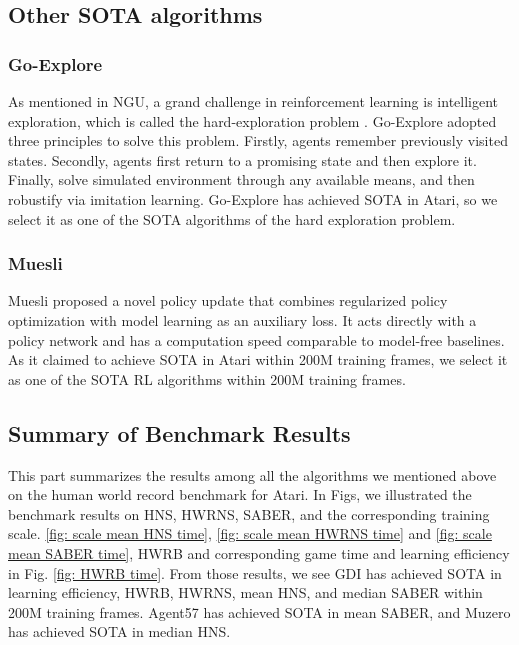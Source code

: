 \documentclass[nohyperref]{article}
\theoremstyle{plain}
\begin{document}
\subsection{Other SOTA algorithms}
\subsubsection{Go-Explore}
As mentioned in NGU, a grand challenge in reinforcement learning is intelligent exploration, which is called the hard-exploration problem \citep{ale2}. Go-Explore \citep{goexplore} adopted three principles to solve this problem. Firstly, agents remember previously visited states. Secondly, agents first return to a promising state and then explore it. Finally, solve simulated environment through any available means, and then robustify via imitation learning. Go-Explore has achieved SOTA in Atari, so we select it as one of the SOTA algorithms of the hard exploration problem.

\subsubsection{Muesli}
Muesli \citep{muesli} proposed a novel policy update that combines regularized policy optimization with model learning as an auxiliary loss. It acts directly with a policy network and has a computation speed comparable to model-free baselines. As it claimed to achieve SOTA in Atari within 200M training frames, we select it as one of the SOTA  RL algorithms within 200M training frames.





\subsection{Summary of Benchmark Results}
This part summarizes the results among all the algorithms we mentioned above on the human world record benchmark for Atari. In Figs, we illustrated the benchmark results on HNS, HWRNS, SABER, and the corresponding training scale. \ref{fig: scale mean HNS time}, \ref{fig: scale mean HWRNS time} and \ref{fig: scale mean SABER time}, HWRB and corresponding game time  and learning efficiency in Fig. \ref{fig: HWRB time}. From those results, we see GDI  has achieved SOTA in learning efficiency, HWRB, HWRNS, mean HNS, and median SABER within 200M training frames. Agent57 has achieved SOTA in mean SABER, and Muzero \citep{muzero} has achieved SOTA in median HNS.
\end{document}
